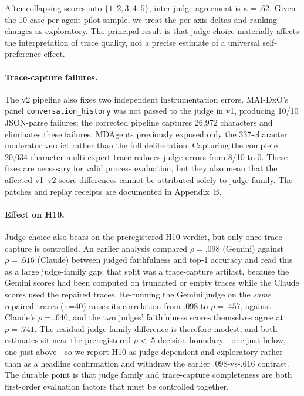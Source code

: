 \documentclass[letterpaper]{article} %
\begin{document}
After collapsing scores into $\{1$--$2,3,4$--$5\}$, inter-judge agreement is $\kappa=.62$. Given the 10-case-per-agent pilot sample, we treat the per-axis deltas and ranking changes as exploratory. The principal result is that judge choice materially affects the interpretation of trace quality, not a precise estimate of a universal self-preference effect.

\paragraph{Trace-capture failures.}
The v2 pipeline also fixes two independent instrumentation errors. MAI-DxO's panel \texttt{conversation\_history} was not passed to the judge in v1, producing 10/10 JSON-parse failures; the corrected pipeline captures 26,972 characters and eliminates these failures. MDAgents previously exposed only the 337-character moderator verdict rather than the full deliberation. Capturing the complete 20,034-character multi-expert trace reduces judge errors from 8/10 to 0. These fixes are necessary for valid process evaluation, but they also mean that the affected v1--v2 score differences cannot be attributed solely to judge family. The patches and replay receipts are documented in Appendix~B.

\paragraph{Effect on H10.}
Judge choice also bears on the preregistered H10 verdict, but only once trace capture is controlled. An earlier analysis compared $\rho=.098$ (Gemini) against $\rho=.616$ (Claude) between judged faithfulness and top-1 accuracy and read this as a large judge-family gap; that split was a trace-capture artifact, because the Gemini scores had been computed on truncated or empty traces while the Claude scores used the repaired traces. Re-running the Gemini judge on the \emph{same} repaired traces (n=40) raises its correlation from .098 to $\rho=.457$, against Claude's $\rho=.640$, and the two judges' faithfulness scores themselves agree at $\rho=.741$. The residual judge-family difference is therefore modest, and both estimates sit near the preregistered $\rho<.5$ decision boundary---one just below, one just above---so we report H10 as judge-dependent and exploratory rather than as a headline confirmation and withdraw the earlier .098-vs-.616 contrast. The durable point is that judge family and trace-capture completeness are both first-order evaluation factors that must be controlled together.
\end{document}
